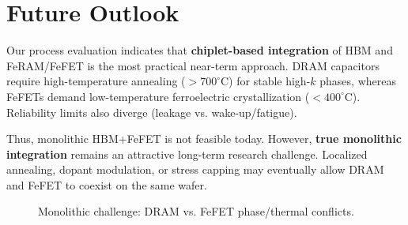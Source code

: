 
\section{Future Outlook}
Our process evaluation indicates that \textbf{chiplet-based integration} of HBM and FeRAM/FeFET
is the most practical near-term approach. DRAM capacitors require high-temperature annealing ($>700^\circ$C)
for stable high-$k$ phases, whereas FeFETs demand low-temperature ferroelectric crystallization ($<400^\circ$C).
Reliability limits also diverge (leakage vs. wake-up/fatigue).

Thus, monolithic HBM+FeFET is not feasible today. However, \textbf{true monolithic integration}
remains an attractive long-term research challenge. Localized annealing, dopant modulation, or stress capping
may eventually allow DRAM and FeFET to coexist on the same wafer.

\begin{figure}[!t]
\centering
{}
\caption{Monolithic challenge: DRAM vs. FeFET phase/thermal conflicts.}
\end{figure}
